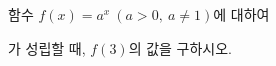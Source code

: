 함수 $f(x)=a^x\ (a>0,\ a\ne 1)$에 대하여 \par\smallskip{}\par\smallskip\noindent 가 성립할 때, $f(3)$의 값을 구하시오.
